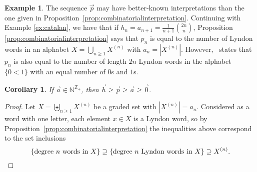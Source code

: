 \documentclass[11pt]{amsart}
\newtheorem{corollary}[theorem]{Corollary}
\theoremstyle{definition}
\newtheorem{example}[theorem]{Example}
\numberwithin{equation}{section}
\def\NN{{\mathbb N}}
\def\ZZ{{\mathbb Z}}
\newcommand{\mike}[1]{\todo[size=\tiny,color=green!30]{#1 \\ \hfill --- Mike}}
\newcommand{\lucas}[1]{\todo[size=\tiny,color=red!50]{#1 \\ \hfill --- Lucas}}
\begin{document}
\begin{example}\label{ex:balancedLyndon}  
The sequence $\vec{p}$ may have better-known interpretations than the one given in  Proposition~\ref{prop:combinatorialinterpretation}.    
Continuing with Example \ref{ex:catalan}, we have that if
$h_n = a_{n+1} = \frac{1}{n+1}\binom{2n}{n}$, Proposition
\ref{prop:combinatorialinterpretation} says that $p_n$ is equal to the number
of Lyndon words in an alphabet $X = \bigcup_{n\geq1} X^{(n)}$ with $a_n = |X^{(n)}|$.
However,~\cite[A022553]{OEIS} states that $p_n$ is also equal to the number of length $2n$ Lyndon words in the alphabet $\{0 < 1\}$ with an equal number of $0$s and $1$s.  
%
%
\end{example}

\begin{corollary}
If $\vec{a} \in \NN^{\ZZ_+}$, then $\vec{h} \geq \vec{p} \geq \vec{a} \geq \vec{0}$.
\end{corollary}
\begin{proof}
Let $X = \biguplus_{n \ge 1} X^{(n)}$ be a graded set with $|X^{(n)}| = a_{n}$.  
Considered as a word with one letter, each element $x \in X$ is a Lyndon word, so by Proposition~\ref{prop:combinatorialinterpretation} the inequalities above correspond to the set inclusions
\[
\{\text{degree $n$ words in $X$}\} 
\supseteq \{\text{degree $n$ Lyndon words in $X$}\} 
\supseteq X^{(n)}. \qedhere
\]
\end{proof}
\end{document}
